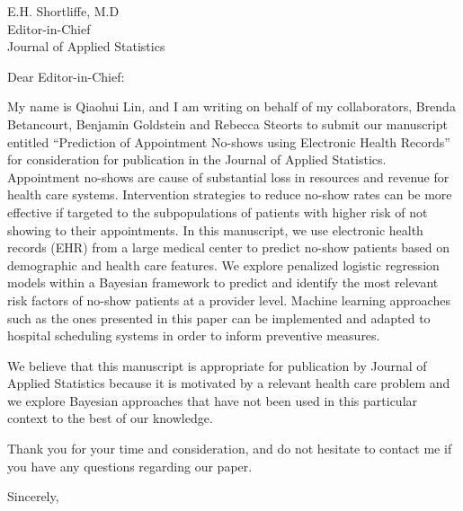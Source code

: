 \documentclass{letter}
\begin{document}
\begin{letter}{E.H. Shortliffe, M.D \\ Editor-in-Chief \\ Journal of Applied Statistics}
\opening{Dear Editor-in-Chief:}

My name is Qiaohui Lin, and I am writing on behalf of my collaborators, Brenda Betancourt, Benjamin Goldstein and Rebecca Steorts to submit our manuscript entitled ``Prediction of Appointment No-shows using Electronic Health Records'' for consideration for publication in the Journal of Applied Statistics.
Appointment no-shows are cause of substantial loss in resources and revenue for health care systems. Intervention strategies to reduce no-show rates can be more effective if targeted
to the subpopulations of patients with higher risk of not showing to their appointments. In this manuscript,
we use electronic health records (EHR) from a large medical center to predict no-show patients based on demographic and health care features. We explore penalized logistic regression models within a Bayesian framework to predict and identify the most relevant risk factors of no-show patients at a provider level. Machine learning approaches such as the ones presented in this paper can be implemented and adapted to hospital scheduling systems in order to inform preventive measures.

We believe that this manuscript is appropriate for publication by Journal of Applied Statistics because it is motivated by a relevant health care problem and we explore Bayesian approaches that  have not been used in this particular context to the best of our knowledge.  

Thank you for your time and consideration, and do not hesitate to contact me if you have any questions regarding our paper. 

\closing{Sincerely,}

\end{letter}
\end{document}
